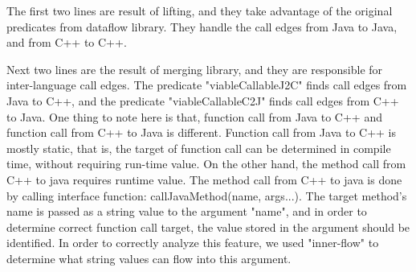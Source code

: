 The first two lines are result of lifting, and they take advantage of the
original predicates from dataflow library.  They handle the call edges from
Java to Java, and from C++ to C++.

Next two lines are the result of merging library, and they are responsible for
inter-language call edges.  The predicate "viableCallableJ2C" finds call edges
from Java to C++, and the predicate "viableCallableC2J" finds call edges from
C++ to Java. One thing to note here is that, function call from Java to C++
and function call from C++ to Java is different. Function call from Java to C++
is mostly static, that is, the target of function call can be determined in compile
time, without requiring run-time value. On the other hand, the method call from C++
to java requires runtime value. The method call from C++ to java is done by calling
interface function: callJavaMethod(name, args...). The target
method's name is passed as a string value to the argument "name",
and in order to determine correct function call target, the value stored in the argument
should be identified. In order to correctly analyze this feature, we used "inner-flow"
to determine what string values can flow into this argument.
